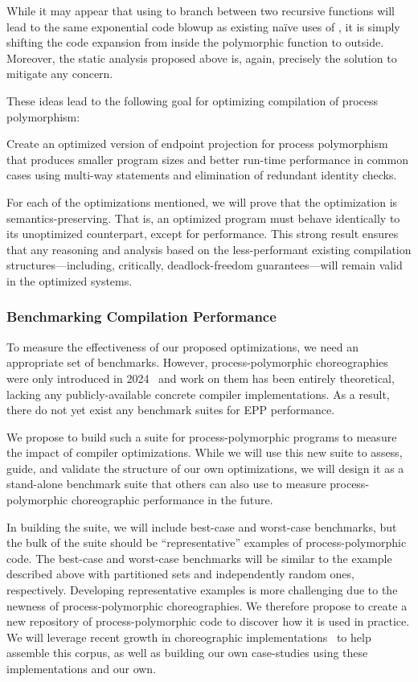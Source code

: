 While it may appear that using \AmIN to branch between two recursive functions will
lead to the same exponential code blowup as existing na\"ive uses of \AmIN,
it is simply shifting the code expansion from inside the polymorphic function to outside.
Moreover, the static analysis proposed above is, again, precisely the solution to mitigate any concern.

These ideas lead to the following goal for optimizing compilation of process polymorphism:
\begin{goal}
  \label{goal:opt-epp}
  Create an optimized version of endpoint projection for process polymorphism
  that produces smaller program sizes and better run-time performance in common cases
  using multi-way \AmIN statements and elimination of redundant identity checks.
\end{goal}

For each of the optimizations mentioned, we will prove that the optimization is semantics-preserving.
That is, an optimized program must behave identically to its unoptimized counterpart, except for performance.
This strong result ensures that any reasoning and analysis based on the less-performant
existing compilation structures---including, critically, deadlock-freedom guarantees---will remain valid in the optimized systems.

\subsubsection{Benchmarking Compilation Performance}

To measure the effectiveness of our proposed optimizations, we need an appropriate set of benchmarks.
However, process-polymorphic choreographies were only introduced in 2024~\citep{GraversenHM24}
and work on them has been entirely theoretical, lacking any publicly-available concrete compiler implementations.
As a result, there do not yet exist any benchmark suites for EPP performance.

We propose to build such a suite for process-polymorphic programs to measure the impact of compiler optimizations.
While we will use this new suite to assess, guide, and validate the structure of our own optimizations,
we will design it as a stand-alone benchmark suite that others can also use to measure process-polymorphic choreographic performance in the future.

In building the suite, we will include best-case and worst-case benchmarks, but the bulk of the suite should be ``representative'' examples of process-polymorphic code.
The best-case and worst-case benchmarks will be similar to the example described above
with partitioned sets and independently random ones, respectively.
Developing representative examples is more challenging due to the newness of process-polymorphic choreographies.
We therefore propose to create a new repository of process-polymorphic code to discover how it is used in practice.
We will leverage recent growth in choreographic implementations~\citep{ShenKK23,BatesK+25,GiallorenzoMP24,BohosianH25}
to help assemble this corpus, as well as building our own case-studies using these implementations and our own.

